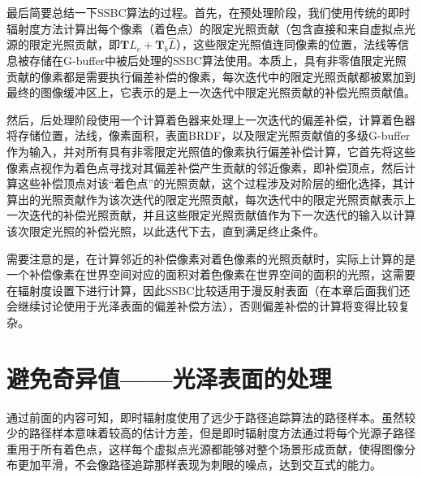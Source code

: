 最后简要总结一下SSBC算法的过程。首先，在预处理阶段，我们使用传统的即时辐射度方法计算出每个像素（着色点）的限定光照贡献（包含直接和来自虚拟点光源的限定光照贡献，即$\mathbf{T}L_e+\mathbf{T}_b\hat{L}$），这些限定光照值连同像素的位置，法线等信息被存储在G-buffer中被后处理的SSBC算法使用。本质上，具有非零值限定光照贡献的像素都是需要执行偏差补偿的像素，每次迭代中的限定光照贡献都被累加到最终的图像缓冲区上，它表示的是上一次迭代中限定光照贡献的补偿光照贡献值。

然后，后处理阶段使用一个计算着色器来处理上一次迭代的偏差补偿，计算着色器将存储位置，法线，像素面积，表面BRDF，以及限定光照贡献值的多级G-buffer作为输入，并对所有具有非零限定光照值的像素执行偏差补偿计算，它首先将这些像素点视作为着色点寻找对其偏差补偿产生贡献的邻近像素，即补偿顶点，然后计算这些补偿顶点对该“着色点”的光照贡献，这个过程涉及对阶层的细化选择，其计算出的光照贡献作为该次迭代的限定光照贡献，每次迭代中的限定光照贡献表示上一次迭代的补偿光照贡献，并且这些限定光照贡献值作为下一次迭代的输入以计算该次限定光照的补偿光照，以此迭代下去，直到满足终止条件。

需要注意的是，在计算邻近的补偿像素对着色像素的光照贡献时，实际上计算的是一个补偿像素在世界空间对应的面积对着色像素在世界空间的面积的光照，这需要在辐射度设置下进行计算，因此SSBC比较适用于漫反射表面（在本章后面我们还会继续讨论使用于光泽表面的偏差补偿方法），否则偏差补偿的计算将变得比较复杂。




\section{避免奇异值——光泽表面的处理}
通过前面的内容可知，即时辐射度使用了远少于路径追踪算法的路径样本。虽然较少的路径样本意味着较高的估计方差，但是即时辐射度方法通过将每个光源子路径重用于所有着色点，这样每个虚拟点光源都能够对整个场景形成贡献，使得图像分布更加平滑，不会像路径追踪那样表现为刺眼的噪点，达到交互式的能力。

